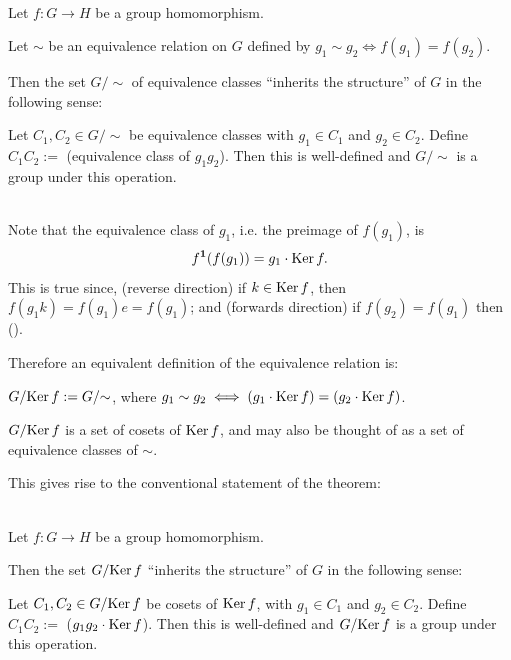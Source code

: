 \begin{theorem}~\\
  Let $f:G \to H$ be a group homomorphism.

  Let $\sim$ be an equivalence relation on $G$ defined by $g_1 \sim g_2 \iff f(g_1) = f(g_2)$.

  Then the set $G/{\sim}$ of equivalence classes ``inherits the structure'' of $G$ in the following
  sense:

  Let $C_1, C_2 \in G/{\sim}$ be equivalence classes with $g_1 \in C_1$ and $g_2 \in C_2$. Define
  $C_1C_2 := $ (equivalence class of $g_1g_2$). Then this is well-defined and $G/{\sim}$ is a group
  under this operation.

\end{theorem}

\begin{remark*}~\\
  Note that the equivalence class of $g_1$, i.e. the preimage of $f(g_1)$, is
  \begin{align*}
    f^{\mathbf 1}(f(g_1)) = g_1\cdot\operatorname{\mathrm{Ker}} f.
  \end{align*}
  This is true since, (reverse direction) if $k \in \operatorname{\mathrm{Ker}} f$, then $f(g_1k) = f(g_1)e = f(g_1)$; and
  (forwards direction) if $f(g_2) = f(g_1)$ then ().

  Therefore an equivalent definition of the equivalence relation is:

  $G/{\operatorname{\mathrm{Ker}} f} := G/{\sim}$, where $g_1 \sim g_2 \iff (g_1\cdot \operatorname{\mathrm{Ker}} f) = (g_2\cdot \operatorname{\mathrm{Ker}} f)$.

  $G/{\operatorname{\mathrm{Ker}} f}$ is a set of cosets of $\operatorname{\mathrm{Ker}} f$, and may also be thought of as a set of equivalence
  classes of $\sim$.

  This gives rise to the conventional statement of the theorem:
\end{remark*}

\begin{theorem}~\\
  Let $f:G \to H$ be a group homomorphism.

  Then the set $G/{\operatorname{\mathrm{Ker}} f}$ ``inherits the structure'' of $G$ in the following sense:

  Let $C_1, C_2 \in G/{\operatorname{\mathrm{Ker}} f}$ be cosets of $\operatorname{\mathrm{Ker}} f$, with $g_1 \in C_1$ and $g_2 \in C_2$. Define
  $C_1C_2 := $ ($g_1g_2\cdot \operatorname{\mathrm{Ker}} f$). Then this is well-defined and $G/{\operatorname{\mathrm{Ker}} f}$ is a group under
  this operation.

\end{theorem}




